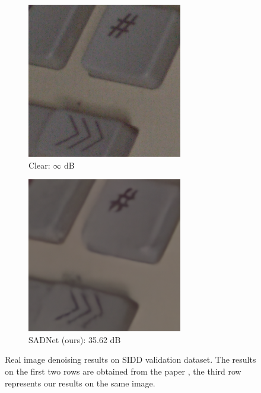 \begin{figure}[t!]
\begin{subfigure}{0.24\textwidth}
        \includegraphics[width=\linewidth]{images/tus_gt.png}
        \caption{Clear: $\infty$ dB}
        \label{fig:tus_clear}
    \end{subfigure}\hfil %
    \begin{subfigure}{0.24\textwidth}
        \includegraphics[width=\linewidth]{images/tus_out.png}
        \caption{SADNet (ours): 35.62 dB}
        \label{fig:tus_out}
    \end{subfigure}\hfil %
    \caption{Real image denoising results on SIDD validation dataset. The results on the first two rows are obtained from the paper \cite{10.1007/978-3-030-58577-8_11},  the third row represents our results on the same image.}
    \label{fig:tus}
\end{figure}

